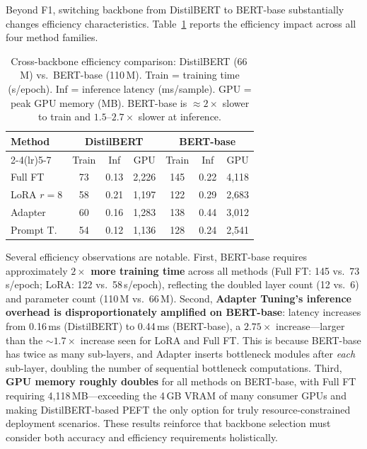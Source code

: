\documentclass[conference]{IEEEtran}
\begin{document}
Beyond F1, switching backbone from DistilBERT to BERT-base substantially changes efficiency characteristics. Table~\ref{tab:backbone_efficiency} reports the efficiency impact across all four method families.

\begin{table}[ht]
\centering
\caption{Cross-backbone efficiency comparison: DistilBERT (66\,M) vs.\ BERT-base (110\,M). Train = training time (s/epoch). Inf = inference latency (ms/sample). GPU = peak GPU memory (MB). BERT-base is ${\approx}2\times$ slower to train and $1.5$--$2.7\times$ slower at inference.}
\label{tab:backbone_efficiency}
\renewcommand{\arraystretch}{1.2}
\setlength{\tabcolsep}{3pt}
\begin{tabular}{lcccccc}
\toprule
\multirow{2}{*}{\textbf{Method}}
  & \multicolumn{3}{c}{\textbf{DistilBERT}}
  & \multicolumn{3}{c}{\textbf{BERT-base}}\\
\cmidrule(lr){2-4}\cmidrule(lr){5-7}
  & Train & Inf & GPU & Train & Inf & GPU\\
\midrule
Full FT    & 73  & 0.13 & 2{,}226 & 145  & 0.22 & 4{,}118\\
LoRA $r{=}8$ & 58  & 0.21 & 1{,}197 & 122  & 0.29 & 2{,}683\\
Adapter    & 60  & 0.16 & 1{,}283 & 138  & 0.44 & 3{,}012\\
Prompt T.  & 54  & 0.12 & 1{,}136 & 128  & 0.24 & 2{,}541\\
\bottomrule
\end{tabular}
\end{table}

Several efficiency observations are notable. First, BERT-base requires approximately \textbf{$2\times$ more training time} across all methods (Full FT: 145 vs.\ 73\,s/epoch; LoRA: 122 vs.\ 58\,s/epoch), reflecting the doubled layer count (12 vs.\ 6) and parameter count (110\,M vs.\ 66\,M). Second, \textbf{Adapter Tuning's inference overhead is disproportionately amplified on BERT-base}: latency increases from 0.16\,ms (DistilBERT) to 0.44\,ms (BERT-base), a $2.75\times$ increase---larger than the ${\sim}1.7\times$ increase seen for LoRA and Full FT. This is because BERT-base has twice as many sub-layers, and Adapter inserts bottleneck modules after \emph{each} sub-layer, doubling the number of sequential bottleneck computations. Third, \textbf{GPU memory roughly doubles} for all methods on BERT-base, with Full FT requiring 4{,}118\,MB---exceeding the 4\,GB VRAM of many consumer GPUs and making DistilBERT-based PEFT the only option for truly resource-constrained deployment scenarios. These results reinforce that backbone selection must consider both accuracy and efficiency requirements holistically.
\end{document}
